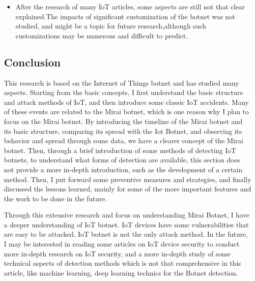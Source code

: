 \documentclass[conference]{IEEEtran}
\begin{document}
\begin{itemize}
\item{After the research of many IoT articles, some aspects are still not that clear explained.The impacts of significant customization of the
botnet was not studied, and might be a topic for future research,although such customizations may be numerous and difficult to
predict.\cite{b7}}
\end{itemize}
\subsection{\textbf{Conclusion}}

This research is based on the Internet of Things botnet and has studied many aspects. Starting from the basic concepts, I first understand the basic structure and attack methods of IoT, and then introduce some classic IoT accidents. Many of these events are related to the Mirai botnet, which is one reason why I plan to focus on the Mirai botnet. By introducing the timeline of the Mirai botnet and its basic structure, comparing its spread with the Iot Botnet, and observing its behavior and spread through some data, we have a clearer concept of the Mirai botnet. Then, through a brief introduction of some methods of detecting IoT botnets, to understand what forms of detection are available, this section does not provide a more in-depth introduction, such as the development of a certain method. Then, I put forward some preventive measures and strategies, and finally discussed the lessons learned, mainly for some of the more important features and the work to be done in the future.

Through this extensive research and focus on understanding Mirai Botnet, I have a deeper understanding of IoT botnet. IoT devices have some vulnerabilities that are easy to be attacked. IoT botnet is not the only attack method. In the future, I may be interested in reading some articles on IoT device security to conduct more in-depth research on IoT security, and a more in-depth study of some technical aspects of detection methods which is not that comprehensive in this article, like machine learning, deep learning technics for the Botnet detection.

\end{document}
